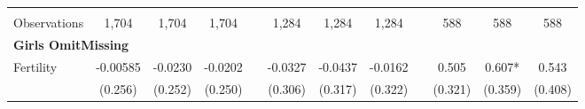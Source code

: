 \begin{landscape}
\begin{table}[htpb!]
\begin{center}
\begin{tabular}{lcccp{2mm}cccp{2mm}ccc}
\begin{footnotesize}\end{footnotesize}&\begin{footnotesize}\end{footnotesize}&\begin{footnotesize}\end{footnotesize}&\begin{footnotesize}\end{footnotesize}&\begin{footnotesize}\end{footnotesize}&\begin{footnotesize}\end{footnotesize}&\begin{footnotesize}\end{footnotesize}&\begin{footnotesize}\end{footnotesize}&\begin{footnotesize}\end{footnotesize}&\begin{footnotesize}\end{footnotesize}&\begin{footnotesize}\end{footnotesize}&\begin{footnotesize}\end{footnotesize}\\Observations&1,704&1,704&1,704&&1,284&1,284&1,284&&588&588&588\\
\multicolumn{12}{l}{\textbf{Girls OmitMissing}}\\ 
Fertility&-0.00585&-0.0230&-0.0202&&-0.0327&-0.0437&-0.0162&&0.505&0.607*&0.543\\
&(0.256)&(0.252)&(0.250)&&(0.306)&(0.317)&(0.322)&&(0.321)&(0.359)&(0.408)\\

\end{tabular}
\end{center}
\end{table}
\end{landscape}
